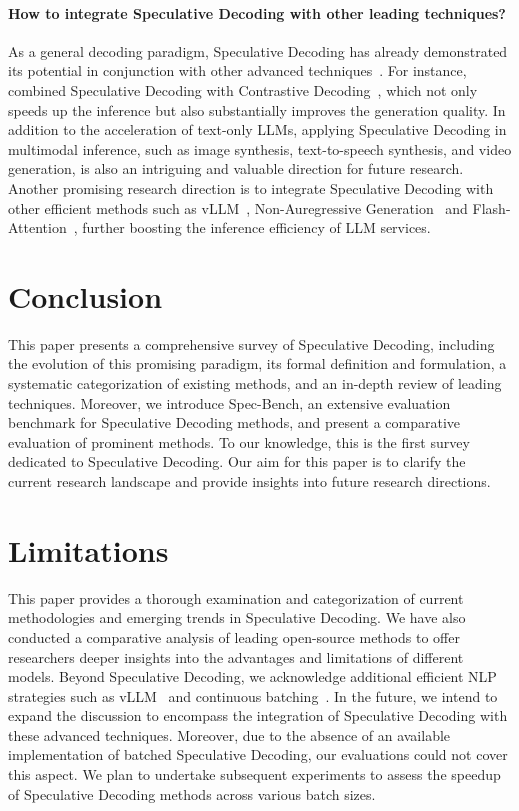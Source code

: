 \paragraph{How to integrate Speculative Decoding with other leading techniques?} As a general decoding paradigm, Speculative Decoding has already demonstrated its potential in conjunction with other advanced techniques~\cite{yang:2023llma, Zhang2023RaLMSpec, Li:2023contrastive}. For instance, \citet{Yuan:2023SCD} combined Speculative Decoding with Contrastive Decoding~\cite{Li:2023contrastive}, which not only speeds up the inference but also substantially improves the generation quality. In addition to the acceleration of text-only LLMs, applying Speculative Decoding in multimodal inference, such as image synthesis, text-to-speech synthesis, and video generation, is also an intriguing and valuable direction for future research. Another promising research direction is to integrate Speculative Decoding with other efficient methods such as vLLM~\cite{Kwon:2023vLLM}, Non-Auregressive Generation~\cite{Du:2021oaxe, Du:2022ngramxe} and Flash-Attention~\cite{Dao:2022flashattention, Dao:2023flashattention2}, further boosting the inference efficiency of LLM services.

\section{Conclusion}
\label{sec:conclusion}
This paper presents a comprehensive survey of Speculative Decoding, including the evolution of this promising paradigm, its formal definition and formulation, a systematic categorization of existing methods, and an in-depth review of leading techniques. Moreover, we introduce Spec-Bench, an extensive evaluation benchmark for Speculative Decoding methods, and present a comparative evaluation of prominent methods. To our knowledge, this is the first survey dedicated to Speculative Decoding. Our aim for this paper is to clarify the current research landscape and provide insights into future research directions.

\section*{Limitations}
\label{subsec:limitation} 

This paper provides a thorough examination and categorization of current methodologies and emerging trends in Speculative Decoding. We have also conducted a comparative analysis of leading open-source methods to offer researchers deeper insights into the advantages and limitations of different models. Beyond Speculative Decoding, we acknowledge additional efficient NLP strategies such as vLLM~\cite{Kwon:2023vLLM} and continuous batching~\cite{Yu:2022continuousbatching}. In the future, we intend to expand the discussion to encompass the integration of Speculative Decoding with these advanced techniques. Moreover, due to the absence of an available implementation of batched Speculative Decoding, our evaluations could not cover this aspect. We plan to undertake subsequent experiments to assess the speedup of Speculative Decoding methods across various batch sizes.

